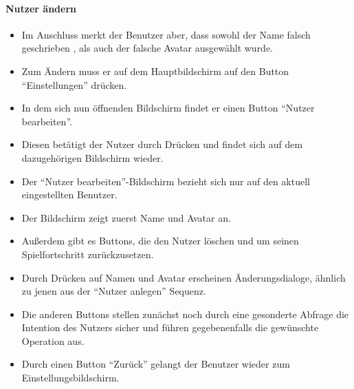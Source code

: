 \paragraph{Nutzer ändern}
\begin{itemize}
\item Im Anschluss merkt der Benutzer aber, dass sowohl der Name falsch geschrieben
, als auch der falsche Avatar ausgewählt wurde.
\item Zum Ändern muss er auf dem Hauptbildschirm auf den Button "`Einstellungen"' drücken.
\item In dem sich nun öffnenden Bildschirm findet er einen Button "`Nutzer bearbeiten"'.
\item Diesen betätigt der Nutzer durch Drücken und findet sich auf dem dazugehörigen
Bildschirm wieder. 
\item Der "`Nutzer bearbeiten"'-Bildschirm bezieht sich nur auf den aktuell eingestellten Benutzer.
\item Der Bildschirm zeigt zuerst Name und Avatar an.
\item Außerdem gibt es Buttons, die den Nutzer löschen und um seinen Spielfortschritt
zurückzusetzen. 
\item Durch Drücken auf Namen und Avatar erscheinen Änderungsdialoge,
ähnlich zu jenen aus der "`Nutzer anlegen"' Sequenz.
\item Die anderen Buttons stellen zunächst noch durch eine gesonderte Abfrage die Intention des 
Nutzers sicher und führen gegebenenfalls die gewünschte Operation aus.
\item Durch einen Button "`Zurück"' gelangt der Benutzer wieder zum Einstellungsbildschirm.
\end{itemize}
